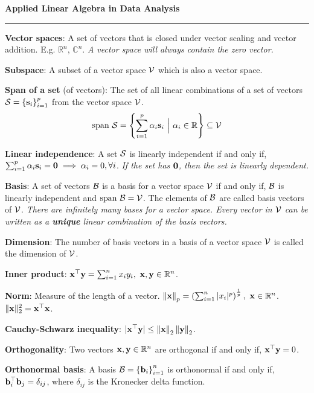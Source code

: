 \documentclass[letterpaper, twocolumn, 11pt]{article}
\let\mc\mathcal
\newcommand{\R}{\mathbb{R}}	%
\newcommand{\C}{\mathbb{C}}	%
\newcommand{\1}{\mathds{1}}	%
\theoremstyle{definition}
\def\mf{\ensuremath\mathbf}
\def\mc{\ensuremath\mathcal}
\def\lp{\ensuremath\left(}
\def\rp{\ensuremath\right)}
\def\lV{\ensuremath\left\lVert}
\def\rV{\ensuremath\right\rVert}
\def\lc{\ensuremath\left\{}
\def\rc{\ensuremath\right\}}
\begin{document}
\begin{center}
    \large{\textbf{Applied Linear Algebra in Data Analysis}}
\end{center}
\hrule
\vspace{0.5cm}

\textbf{Vector spaces}: A set of vectors that is closed under vector scaling and vector addition. E.g. $\R^n$, $\C^n$. \textit{A vector space will always contain the zero vector.}

\textbf{Subspace}: A subset of a vector space $\mc{V}$ which is also a vector space.

\textbf{Span of a set} (of vectors): The set of all linear combinations of a set of vectors $\mc{S} = \lc \mf{s}_i \rc_{i=1}^{p}$ from the vector space $\mc{V}$.
\[ \text{span } \mc{S} = \lc \sum_{i=1}^p \alpha_i \mf{s}_i \,\, \Big \vert \,\, \alpha_i \in \R \rc \subseteq \mc{V}\]

\textbf{Linear independence}: A set $\mc{S}$ is linearly independent if and only if, $\sum_{i=1}^p \alpha_i \mf{s}_i = \mf{0} \implies \alpha_i = 0, \forall i$. \textit{If the set has $\mf{0}$, then the set is linearly dependent.}

\textbf{Basis}: A set of vectors $\mc{B}$ is a basis for a vector space $\mc{V}$ if and only if, $\mc{B}$ is linearly independent and $\text{span }\mc{B} = \mc{V}$. The elements of $\mc{B}$ are called basis vectors of $\mc{V}$. \textit{There are infinitely many bases for a vector space. Every vector in $\mc{V}$ can be written as a \textbf{unique} linear combination of the basis vectors.}

\textbf{Dimension}: The number of basis vectors in a basis of a vector space $\mc{V}$ is called the dimension of $\mc{V}$.

\textbf{Inner product}: $\mf{x}^\top\mf{y} = \sum_{i=1}^n x_i y_i, \,\, \mf{x}, \mf{y} \in \R^n$.

\textbf{Norm}: Measure of the length of a vector. $\lV \mf{x} \rV_p = \lp \sum_{i=1}^n \vert x_i \vert^p \rp^{\frac{1}{p}}, \,\, \mf{x} \in \R^n$. $\Vert \mf{x} \Vert_2^2 = \mf{x}^\top \mf{x}$.

\textbf{Cauchy-Schwarz inequality}: $\vert \mf{x}^\top \mf{y} \vert \leq \lV \mf{x} \rV_2 \lV \mf{y} \rV_2$.

\textbf{Orthogonality}: Two vectors $\mf{x}, \mf{y} \in \R^n$ are orthogonal if and only if, $\mf{x}^\top \mf{y} = 0$.

\textbf{Orthonormal basis}: A basis $\mc{B} = \lc \mf{b}_i \rc_{i=1}^n$ is orthonormal if and only if, $\mf{b}_i^\top \mf{b}_j = \delta_{ij}$, where $\delta_{ij}$ is the Kronecker delta function.
\end{document}
